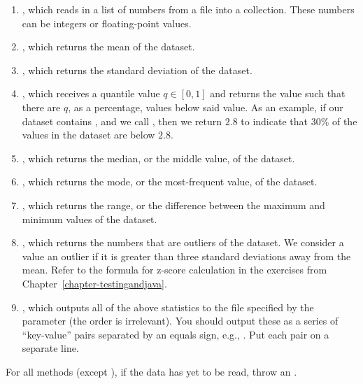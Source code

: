 \begin{enumerate}[label=(\alph*)]
    \item {}, which reads in a list of numbers from a file into a collection. These numbers can be integers or floating-point values.
    \item {}, which returns the mean of the dataset.
    \item {}, which returns the standard deviation of the dataset.
    \item {}, which receives a quantile value $q \in [0, 1]$ and returns the value such that there are $q$, as a percentage, values below said value. As an example, if our dataset contains , and we call , then we return $2.8$ to indicate that $30\%$ of the values in the dataset are below $2.8$. 
    \item {}, which returns the median, or the middle value, of the dataset.
    \item {}, which returns the mode, or the most-frequent value, of the dataset.
    \item {}, which returns the range, or the difference between the maximum and minimum values of the dataset.
    \item {}, which returns the numbers that are outliers of the dataset. We consider a value an outlier if it is greater than three standard deviations away from the mean. Refer to the formula for z-score calculation in the exercises from Chapter~\ref{chapter-testingandjava}.
    \item {}, which outputs all of the above statistics to the file specified by the parameter (the order is irrelevant). You should output these as a series of ``key-value'' pairs separated by an equals sign, e.g., . Put each pair on a separate line.
\end{enumerate}

For all methods (except ), if the data has yet to be read, throw an . 


